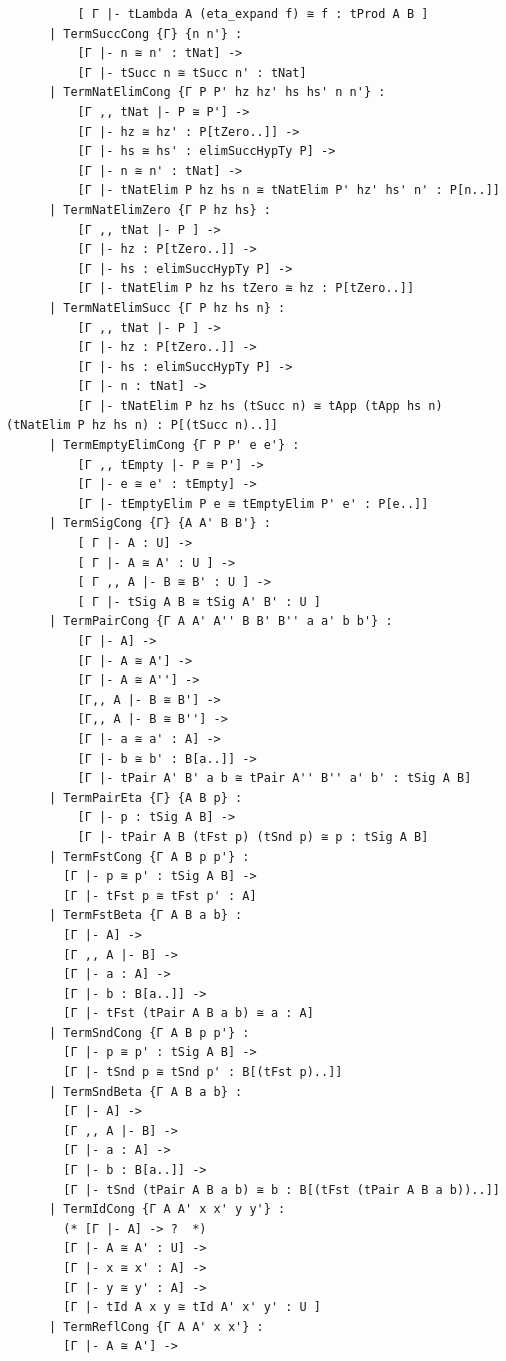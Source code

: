 \begin{lstlisting}
          [ Γ |- tLambda A (eta_expand f) ≅ f : tProd A B ]
      | TermSuccCong {Γ} {n n'} :
          [Γ |- n ≅ n' : tNat] ->
          [Γ |- tSucc n ≅ tSucc n' : tNat]
      | TermNatElimCong {Γ P P' hz hz' hs hs' n n'} :
          [Γ ,, tNat |- P ≅ P'] ->
          [Γ |- hz ≅ hz' : P[tZero..]] ->
          [Γ |- hs ≅ hs' : elimSuccHypTy P] ->
          [Γ |- n ≅ n' : tNat] ->
          [Γ |- tNatElim P hz hs n ≅ tNatElim P' hz' hs' n' : P[n..]]        
      | TermNatElimZero {Γ P hz hs} :
          [Γ ,, tNat |- P ] ->
          [Γ |- hz : P[tZero..]] ->
          [Γ |- hs : elimSuccHypTy P] ->
          [Γ |- tNatElim P hz hs tZero ≅ hz : P[tZero..]]
      | TermNatElimSucc {Γ P hz hs n} :
          [Γ ,, tNat |- P ] ->
          [Γ |- hz : P[tZero..]] ->
          [Γ |- hs : elimSuccHypTy P] ->
          [Γ |- n : tNat] ->
          [Γ |- tNatElim P hz hs (tSucc n) ≅ tApp (tApp hs n) (tNatElim P hz hs n) : P[(tSucc n)..]]
      | TermEmptyElimCong {Γ P P' e e'} :
          [Γ ,, tEmpty |- P ≅ P'] ->
          [Γ |- e ≅ e' : tEmpty] ->
          [Γ |- tEmptyElim P e ≅ tEmptyElim P' e' : P[e..]]
      | TermSigCong {Γ} {A A' B B'} :
          [ Γ |- A : U] ->
          [ Γ |- A ≅ A' : U ] ->
          [ Γ ,, A |- B ≅ B' : U ] ->
          [ Γ |- tSig A B ≅ tSig A' B' : U ]
      | TermPairCong {Γ A A' A'' B B' B'' a a' b b'} :
          [Γ |- A] ->
          [Γ |- A ≅ A'] ->
          [Γ |- A ≅ A''] ->
          [Γ,, A |- B ≅ B'] ->
          [Γ,, A |- B ≅ B''] ->
          [Γ |- a ≅ a' : A] ->
          [Γ |- b ≅ b' : B[a..]] ->
          [Γ |- tPair A' B' a b ≅ tPair A'' B'' a' b' : tSig A B]
      | TermPairEta {Γ} {A B p} :
          [Γ |- p : tSig A B] ->
          [Γ |- tPair A B (tFst p) (tSnd p) ≅ p : tSig A B]
      | TermFstCong {Γ A B p p'} :
        [Γ |- p ≅ p' : tSig A B] ->
        [Γ |- tFst p ≅ tFst p' : A]
      | TermFstBeta {Γ A B a b} :
        [Γ |- A] ->
        [Γ ,, A |- B] ->
        [Γ |- a : A] ->
        [Γ |- b : B[a..]] ->
        [Γ |- tFst (tPair A B a b) ≅ a : A]
      | TermSndCong {Γ A B p p'} :
        [Γ |- p ≅ p' : tSig A B] ->
        [Γ |- tSnd p ≅ tSnd p' : B[(tFst p)..]]
      | TermSndBeta {Γ A B a b} :
        [Γ |- A] ->
        [Γ ,, A |- B] ->
        [Γ |- a : A] ->
        [Γ |- b : B[a..]] ->
        [Γ |- tSnd (tPair A B a b) ≅ b : B[(tFst (tPair A B a b))..]]
      | TermIdCong {Γ A A' x x' y y'} :
        (* [Γ |- A] -> ?  *)
        [Γ |- A ≅ A' : U] ->
        [Γ |- x ≅ x' : A] ->
        [Γ |- y ≅ y' : A] ->
        [Γ |- tId A x y ≅ tId A' x' y' : U ]
      | TermReflCong {Γ A A' x x'} :
        [Γ |- A ≅ A'] ->

\end{lstlisting}
